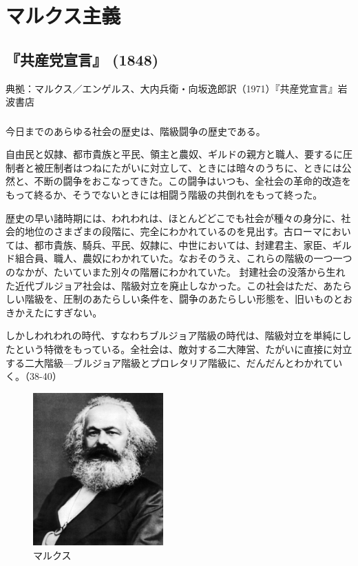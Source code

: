 
\chapter{マルクス主義}


\section{『共産党宣言』 (1848)}


典拠：マルクス／エンゲルス、大内兵衛・向坂逸郎訳（1971）『共産党宣言』岩波書店

\subsection{}


今日までのあらゆる社会の歴史は、階級闘争の歴史である。

自由民と奴隷、都市貴族と平民、領主と農奴、ギルドの親方と職人、要するに圧制者と被圧制者はつねにたがいに対立して、ときには暗々のうちに、ときには公然と、不断の闘争をおこなってきた。この闘争はいつも、全社会の革命的改造をもって終るか、そうでないときには相闘う階級の共倒れをもって終った。

歴史の早い諸時期には、われわれは、ほとんどどこでも社会が種々の身分に、社会的地位のさまざまの段階に、完全にわかれているのを見出す。古ローマにおいては、都市貴族、騎兵、平民、奴隷に、中世においては、封建君主、家臣、ギルド組合員、職人、農奴にわかれていた。なおそのうえ、これらの階級の一つ一つのなかが、たいていまた別々の階層にわかれていた。
封建社会の没落から生れた近代ブルジョア社会は、階級対立を廃止しなかった。この社会はただ、あたらしい階級を、圧制のあたらしい条件を、闘争のあたらしい形態を、旧いものとおきかえたにすぎない。

しかしわれわれの時代、すなわちブルジョア階級の時代は、階級対立を単純にしたという特徴をもっている。全社会は、敵対する二大陣営、たがいに直接に対立する二大階級{\——}ブルジョア階級とプロレタリア階級に、だんだんとわかれていく。（38-40）


  \begin{figure}[htbp]
    \centering
      \includegraphics[width=50mm]{images/Karl_Marx.jpg}
      \caption{マルクス} 
  \end{figure}



